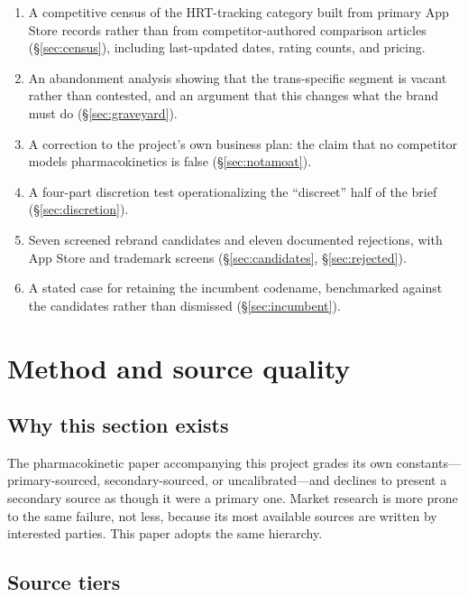 \documentclass[11pt,a4paper]{article}
\begin{document}
\begin{enumerate}[leftmargin=1.5em,itemsep=0.25em]
\item A competitive census of the HRT-tracking category built from
      primary App Store records rather than from competitor-authored
      comparison articles (\S\ref{sec:census}), including
      last-updated dates, rating counts, and pricing.
\item An abandonment analysis showing that the trans-specific segment
      is vacant rather than contested, and an argument that this
      changes what the brand must do (\S\ref{sec:graveyard}).
\item A correction to the project's own business plan: the claim that
      no competitor models pharmacokinetics is false
      (\S\ref{sec:notamoat}).
\item A four-part discretion test operationalizing the ``discreet''
      half of the brief (\S\ref{sec:discretion}).
\item Seven screened rebrand candidates and eleven documented
      rejections, with App Store and trademark screens
      (\S\ref{sec:candidates}, \S\ref{sec:rejected}).
\item A stated case for retaining the incumbent codename, benchmarked
      against the candidates rather than dismissed
      (\S\ref{sec:incumbent}).
\end{enumerate}

\section{Method and source quality}
\label{sec:method}

\subsection{Why this section exists}

The pharmacokinetic paper accompanying this project grades its own
constants---primary-sourced, secondary-sourced, or uncalibrated---and
declines to present a secondary source as though it were a primary one.
Market research is more prone to the same failure, not less, because
its most available sources are written by interested parties. This
paper adopts the same hierarchy.

\subsection{Source tiers}
\end{document}
